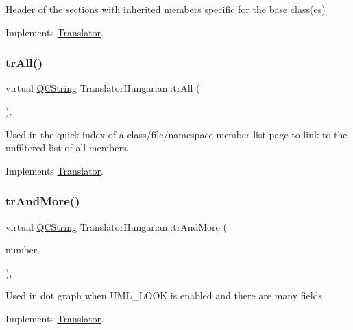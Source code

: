 Header of the sections with inherited members specific for the base class(es) 

Implements \mbox{\hyperlink{class_translator}{Translator}}.

\mbox{\label{class_translator_hungarian_a3a0802aaeed3d27dffa7c11043ab29ce}} 
\subsubsection{\texorpdfstring{trAll()}{trAll()}}
{\footnotesize\ttfamily virtual \mbox{\hyperlink{class_q_c_string}{Q\+C\+String}} Translator\+Hungarian\+::tr\+All (\begin{DoxyParamCaption}{ }\end{DoxyParamCaption})\hspace{0.3cm}{\ttfamily [inline]}, {\ttfamily [virtual]}}

Used in the quick index of a class/file/namespace member list page to link to the unfiltered list of all members. 

Implements \mbox{\hyperlink{class_translator}{Translator}}.

\mbox{\label{class_translator_hungarian_ab104928ac469feab371dbdb82e2c2c0d}} 
\subsubsection{\texorpdfstring{trAndMore()}{trAndMore()}}
{\footnotesize\ttfamily virtual \mbox{\hyperlink{class_q_c_string}{Q\+C\+String}} Translator\+Hungarian\+::tr\+And\+More (\begin{DoxyParamCaption}\item[{const \mbox{\hyperlink{class_q_c_string}{Q\+C\+String}} \&}]{number }\end{DoxyParamCaption})\hspace{0.3cm}{\ttfamily [inline]}, {\ttfamily [virtual]}}

Used in dot graph when U\+M\+L\+\_\+\+L\+O\+OK is enabled and there are many fields 

Implements \mbox{\hyperlink{class_translator}{Translator}}.

\mbox{\label{class_translator_hungarian_aceb8864fd013ffb7092738c599d8d79e}} 
